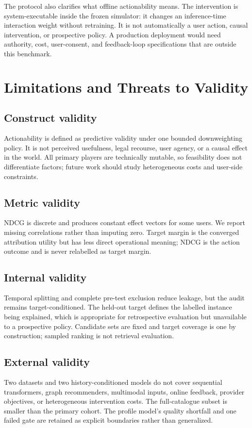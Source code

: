 \documentclass[pdflatex,sn-basic,Numbered]{sn-jnl}
\begin{document}
The protocol also clarifies what offline actionability means. The intervention is system-executable inside the frozen simulator: it changes an inference-time interaction weight without retraining. It is not automatically a user action, causal intervention, or prospective policy. A production deployment would need authority, cost, user-consent, and feedback-loop specifications that are outside this benchmark.

\section{Limitations and Threats to Validity}
\subsection{Construct validity}
Actionability is defined as predictive validity under one bounded downweighting policy. It is not perceived usefulness, legal recourse, user agency, or a causal effect in the world. All primary players are technically mutable, so feasibility does not differentiate factors; future work should study heterogeneous costs and user-side constraints.

\subsection{Metric validity}
NDCG is discrete and produces constant effect vectors for some users. We report missing correlations rather than imputing zero. Target margin is the converged attribution utility but has less direct operational meaning; NDCG is the action outcome and is never relabelled as target margin.

\subsection{Internal validity}
Temporal splitting and complete pre-test exclusion reduce leakage, but the audit remains target-conditioned. The held-out target defines the labelled instance being explained, which is appropriate for retrospective evaluation but unavailable to a prospective policy. Candidate sets are fixed and target coverage is one by construction; sampled ranking is not retrieval evaluation.

\subsection{External validity}
Two datasets and two history-conditioned models do not cover sequential transformers, graph recommenders, multimodal inputs, online feedback, provider objectives, or heterogeneous intervention costs. The full-catalogue subset is smaller than the primary cohort. The profile model’s quality shortfall and one failed gate are retained as explicit boundaries rather than generalized.
\end{document}
